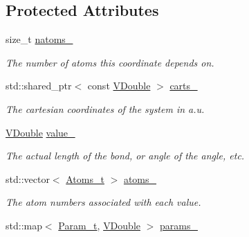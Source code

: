 \subsection*{Protected Attributes}
\begin{DoxyCompactItemize}
\item 
size\+\_\+t \hyperlink{classFManII_1_1IntCoords_a3fb097438609927dda0f1a049ff61a72}{natoms\+\_\+}\hypertarget{classFManII_1_1IntCoords_a3fb097438609927dda0f1a049ff61a72}{}\label{classFManII_1_1IntCoords_a3fb097438609927dda0f1a049ff61a72}

\begin{DoxyCompactList}\small\item\em The number of atoms this coordinate depends on. \end{DoxyCompactList}\item 
std\+::shared\+\_\+ptr$<$ const \hyperlink{classFManII_1_1IntCoords_af42df2795dec16350f908cfd5ac2ef06}{V\+Double} $>$ \hyperlink{classFManII_1_1IntCoords_a54cd82d40213e7c85ea338b79438b22a}{carts\+\_\+}\hypertarget{classFManII_1_1IntCoords_a54cd82d40213e7c85ea338b79438b22a}{}\label{classFManII_1_1IntCoords_a54cd82d40213e7c85ea338b79438b22a}

\begin{DoxyCompactList}\small\item\em The cartesian coordinates of the system in a.\+u. \end{DoxyCompactList}\item 
\hyperlink{classFManII_1_1IntCoords_af42df2795dec16350f908cfd5ac2ef06}{V\+Double} \hyperlink{classFManII_1_1IntCoords_a1dfc726f1b6060c0f4e26eafb51953f9}{value\+\_\+}\hypertarget{classFManII_1_1IntCoords_a1dfc726f1b6060c0f4e26eafb51953f9}{}\label{classFManII_1_1IntCoords_a1dfc726f1b6060c0f4e26eafb51953f9}

\begin{DoxyCompactList}\small\item\em The actual length of the bond, or angle of the angle, etc. \end{DoxyCompactList}\item 
std\+::vector$<$ \hyperlink{classFManII_1_1IntCoords_a59ab25571f774fca97644a2ce5ade359}{Atoms\+\_\+t} $>$ \hyperlink{classFManII_1_1IntCoords_a4f7c142879fb222c66ae6968160d36c0}{atoms\+\_\+}\hypertarget{classFManII_1_1IntCoords_a4f7c142879fb222c66ae6968160d36c0}{}\label{classFManII_1_1IntCoords_a4f7c142879fb222c66ae6968160d36c0}

\begin{DoxyCompactList}\small\item\em The atom numbers associated with each value. \end{DoxyCompactList}\item 
std\+::map$<$ \hyperlink{namespaceFManII_ab331802fde4c5f2564443f1704c25363}{Param\+\_\+t}, \hyperlink{classFManII_1_1IntCoords_af42df2795dec16350f908cfd5ac2ef06}{V\+Double} $>$ \hyperlink{classFManII_1_1IntCoords_ab1a5fd9c10badbeb02ac40516a7183cc}{params\+\_\+}\hypertarget{classFManII_1_1IntCoords_ab1a5fd9c10badbeb02ac40516a7183cc}{}\label{classFManII_1_1IntCoords_ab1a5fd9c10badbeb02ac40516a7183cc}


\end{DoxyCompactItemize}
